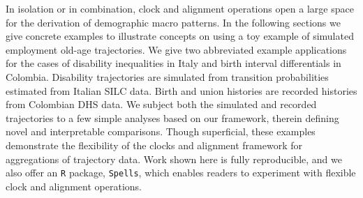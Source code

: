 \documentclass{article}
\begin{document}
In isolation or in combination, clock and alignment operations open a large space for the derivation of demographic macro patterns. In the following sections we give concrete examples to illustrate concepts on using a toy example of simulated employment old-age trajectories. We give two abbreviated example applications for the cases of disability inequalities in Italy and birth interval differentials in Colombia. Disability trajectories are simulated from transition probabilities estimated from Italian SILC data. Birth and union histories are recorded histories from Colombian DHS data. We subject both the simulated and recorded trajectories to a few simple analyses based on our framework, therein defining novel and interpretable comparisons. Though superficial, these examples demonstrate the flexibility of the clocks and alignment framework for aggregations of trajectory data. Work shown here is fully reproducible, and we also offer an \texttt{R} package, \texttt{Spells}, which enables readers to experiment with flexible clock and alignment operations.
% 

\end{document}
